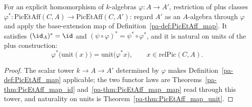 \begin{definition}
  \label{pa-def:PicEtAff_mapAlg}
  \leanok

  For an explicit homomorphism of \(k\)-algebras \(\varphi \colon A \to A'\), restriction of
  plus classes \(\varphi^{*} \colon \mathrm{PicEtAff}(C,A) \to \mathrm{PicEtAff}(C,A')\):
  regard \(A'\) as an \(A\)-algebra through \(\varphi\) and apply the base-extension map of
  Definition~\ref{pa-def:PicEtAff_map}. It satisfies \((\id_A)^{*} = \id\) and
  \((\psi \circ \varphi)^{*} = \psi^{*} \circ \varphi^{*}\), and it is natural on units of
  the plus construction:
  \[
    \varphi^{*}\bigl(\mathrm{unit}(x)\bigr) = \mathrm{unit}\bigl(\varphi^{*} x\bigr),
    \qquad x \in \mathrm{relPic}(C,A).
  \]
\end{definition}
\begin{proof}
  \leanok
  The scalar tower \(k \to A \to A'\) determined by \(\varphi\) makes
  Definition~\ref{pa-def:PicEtAff_map} applicable; the two functor laws are
  Theorems~\ref{pa-thm:PicEtAff_map_id} and~\ref{pa-thm:PicEtAff_map_map} read through this tower,
  and naturality on units is Theorem~\ref{pa-thm:PicEtAff_map_unit}.
\end{proof}

